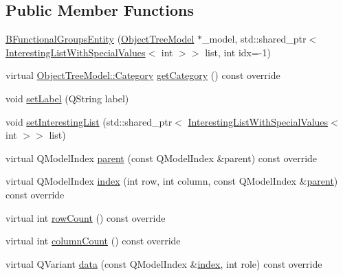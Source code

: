 \subsection*{Public Member Functions}
\begin{DoxyCompactItemize}
\item 
\mbox{\hyperlink{classobjecttree_1_1_b_functional_groups_entity_ad5e9d6c77300cd75e91d6c3d55b715c4}{B\+Functional\+Groups\+Entity}} (\mbox{\hyperlink{class_object_tree_model}{Object\+Tree\+Model}} $\ast$\+\_\+model, std\+::shared\+\_\+ptr$<$ \mbox{\hyperlink{class_interesting_list_with_special_values}{Interesting\+List\+With\+Special\+Values}}$<$ int $>$$>$ list, int idx=-\/1)
\item 
virtual \mbox{\hyperlink{class_object_tree_model_a379e9d6b0d381853785adf62095ba4e3}{Object\+Tree\+Model\+::\+Category}} \mbox{\hyperlink{classobjecttree_1_1_b_functional_groups_entity_a0a80942b0dac5d3f7ac46af3866071ce}{get\+Category}} () const override
\item 
void \mbox{\hyperlink{classobjecttree_1_1_b_functional_groups_entity_a5e9a154cb680c1fad806d7ec1a3d2407}{set\+Label}} (Q\+String label)
\item 
void \mbox{\hyperlink{classobjecttree_1_1_b_functional_groups_entity_a830e15b808a5b9c12db5d3c40b8abaeb}{set\+Interesting\+List}} (std\+::shared\+\_\+ptr$<$ \mbox{\hyperlink{class_interesting_list_with_special_values}{Interesting\+List\+With\+Special\+Values}}$<$ int $>$$>$ list)
\item 
virtual Q\+Model\+Index \mbox{\hyperlink{classobjecttree_1_1_b_functional_groups_entity_a9334b276b7f7cfb8bb6b0c45bf40d1f9}{parent}} (const Q\+Model\+Index \&parent) const override
\item 
virtual Q\+Model\+Index \mbox{\hyperlink{classobjecttree_1_1_b_functional_groups_entity_a52beb91ea69c7ee35ea1da3facc97196}{index}} (int row, int column, const Q\+Model\+Index \&\mbox{\hyperlink{classobjecttree_1_1_b_functional_groups_entity_a9334b276b7f7cfb8bb6b0c45bf40d1f9}{parent}}) const override
\item 
virtual int \mbox{\hyperlink{classobjecttree_1_1_b_functional_groups_entity_a508d3490a31642a6468c76aa911dab35}{row\+Count}} () const override
\item 
virtual int \mbox{\hyperlink{classobjecttree_1_1_b_functional_groups_entity_a4fbae4e27de2f9d5cd521ace87ee5423}{column\+Count}} () const override
\item 
virtual Q\+Variant \mbox{\hyperlink{classobjecttree_1_1_b_functional_groups_entity_ae82da4869c7819655bba90eb01da1e3e}{data}} (const Q\+Model\+Index \&\mbox{\hyperlink{classobjecttree_1_1_b_functional_groups_entity_a52beb91ea69c7ee35ea1da3facc97196}{index}}, int role) const override

\end{DoxyCompactItemize}
